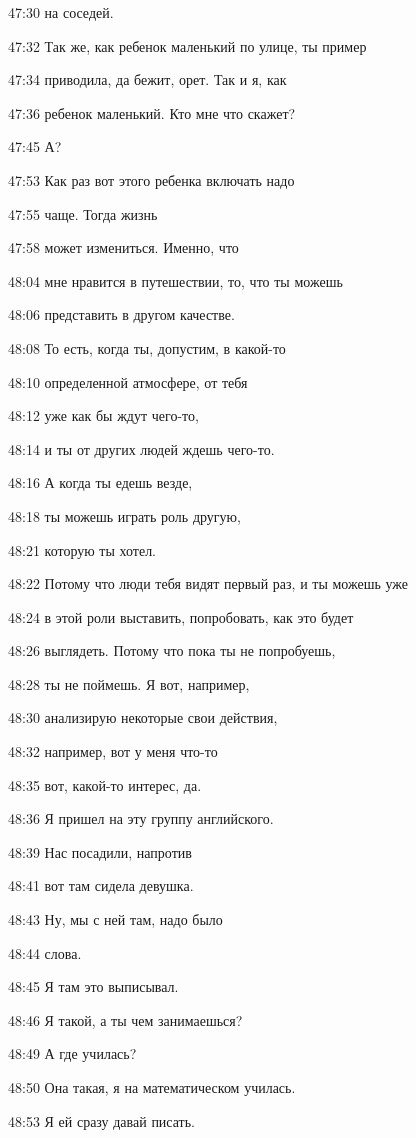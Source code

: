 47:30
на соседей.

47:32
Так же, как ребенок маленький по улице, ты пример

47:34
приводила, да бежит, орет. Так и я, как

47:36
ребенок маленький. Кто мне что скажет?

47:45
А?

47:53
Как раз вот этого ребенка включать надо

47:55
чаще. Тогда жизнь

47:58
может измениться. Именно, что

48:04
мне нравится в путешествии, то, что ты можешь

48:06
представить в другом качестве.

48:08
То есть, когда ты, допустим, в какой-то

48:10
определенной атмосфере, от тебя

48:12
уже как бы ждут чего-то,

48:14
и ты от других людей ждешь чего-то.

48:16
А когда ты едешь везде,

48:18
ты можешь играть роль другую,

48:21
которую ты хотел.

48:22
Потому что люди тебя видят первый раз, и ты можешь уже

48:24
в этой роли выставить, попробовать, как это будет

48:26
выглядеть. Потому что пока ты не попробуешь,

48:28
ты не поймешь. Я вот, например,

48:30
анализирую некоторые свои действия,

48:32
например, вот у меня что-то

48:35
вот, какой-то интерес, да.

48:36
Я пришел на эту группу английского.

48:39
Нас посадили, напротив

48:41
вот там сидела девушка.

48:43
Ну, мы с ней там, надо было

48:44
слова.

48:45
Я там это выписывал.

48:46
Я такой, а ты чем занимаешься?

48:49
А где училась?

48:50
Она такая, я на математическом училась.

48:53
Я ей сразу давай писать.


